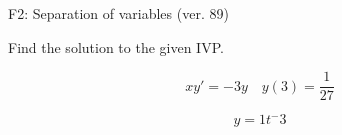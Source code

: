 \begin{exercise}
  \begin{exerciseTitle}F2: Separation of variables (ver. 89)\end{exerciseTitle}
  \begin{exerciseStatement}
    
Find the solution to the given IVP.

    
\[xy'= -3 y \hspace{1em} y( 3 ) = \frac{1}{27}\]

  \end{exerciseStatement}
  \begin{exerciseAnswer}
    
\[y= 1 t^ -3\]

  \end{exerciseAnswer}
\end{exercise}